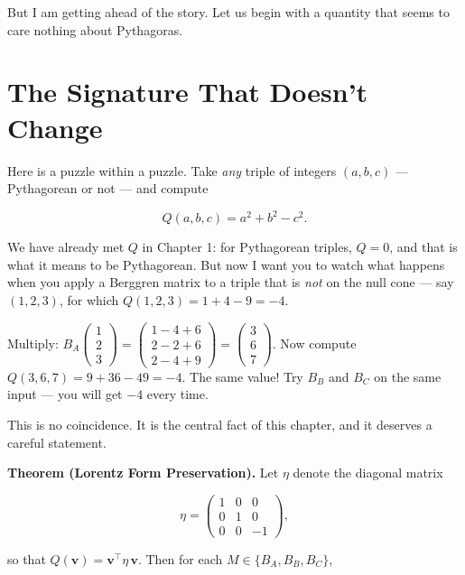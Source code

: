 But I am getting ahead of the story. Let us begin with a quantity that seems to care nothing about Pythagoras.



\section{The Signature That Doesn't Change}\label{ch5-the-signature-that-doesnt-change}

Here is a puzzle within a puzzle. Take \emph{any} triple of integers \((a, b, c)\) --- Pythagorean or not --- and compute

\[Q(a, b, c) = a^2 + b^2 - c^2.\]

We have already met \(Q\) in Chapter 1: for Pythagorean triples, \(Q = 0\), and that is what it means to be Pythagorean. But now I want you to watch what happens when you apply a Berggren matrix to a triple that is \emph{not} on the null cone --- say \((1, 2, 3)\), for which \(Q(1, 2, 3) = 1 + 4 - 9 = -4\).

Multiply: \(B_A \begin{pmatrix} 1 \\ 2 \\ 3 \end{pmatrix} = \begin{pmatrix} 1 - 4 + 6 \\ 2 - 2 + 6 \\ 2 - 4 + 9 \end{pmatrix} = \begin{pmatrix} 3 \\ 6 \\ 7 \end{pmatrix}.\) Now compute \(Q(3, 6, 7) = 9 + 36 - 49 = -4.\) The same value! Try \(B_B\) and \(B_C\) on the same input --- you will get \(-4\) every time.

This is no coincidence. It is the central fact of this chapter, and it deserves a careful statement.

\textbf{Theorem (Lorentz Form Preservation).} Let \(\eta\) denote the diagonal matrix

\[\eta = \begin{pmatrix} 1 & 0 & 0 \\ 0 & 1 & 0 \\ 0 & 0 & -1 \end{pmatrix},\]

so that \(Q(\mathbf{v}) = \mathbf{v}^\top \eta\, \mathbf{v}\). Then for each \(M \in \{B_A, B_B, B_C\}\),

